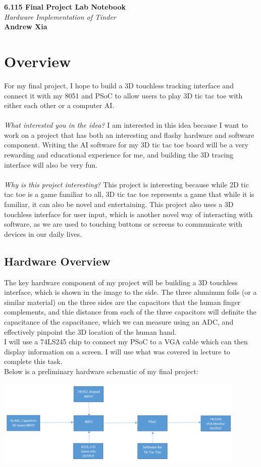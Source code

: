 \documentclass[12pt,twoside]{article}
\newcommand{\andrew}{Andrew Xia}
\newcommand{\name}{6.115 Final Project Lab Notebook}
\begin{document}
 
\begin{center} {\bf \Large \name}
\\ \emph{Hardware Implementation of Tinder}
\\ {\bf \andrew}
\end{center}
\section{Overview}
For my final project, I hope to build a 3D touchless tracking interface and connect it with my 8051 and PSoC to allow users to play 3D tic tac toe with either each other or a computer AI. 
\\
\\ \emph{What interested you in the idea?} I am interested in this idea because I want to work on a project that has both an interesting and flashy hardware and software component. Writing the AI software for my 3D tic tac toe board will be a very rewarding and educational experience for me, and building the 3D tracing interface will also be very fun. 
\\ 
\\ \emph{Why is this project interesting?} This project is interesting because while 2D tic tac toe is a game familiar to all, 3D tic tac toe represents a game that while it is familiar, it can also be novel and entertaining. This project also uses a 3D touchless interface for user input, which is another novel way of interacting with software, as we are used to touching buttons or screens to communicate with devices in our daily lives. 

\subsection{Hardware Overview}
The key hardware component of my project will be building a 3D touchless interface, which is shown in the image to the side. The three aluminum foils (or a similar material) on the three sides are the capacitors that the human finger complements, and thie distance from each of the three capacitors will definite the capacitance of the capacitance, which we can measure using an ADC, and effectively pinpoint the 3D location of the human hand. 
\\ I will use a 74LS245 chip to connect my PSoC to a VGA cable which can then display information on a screen. I will use what was covered in lecture to complete this task. 
\\ Below is a preliminary hardware schematic of my final project:
\begin{center}\includegraphics[width = 120mm]{../Proposals/Hardware_final.png} \end{center}
\end{document}
